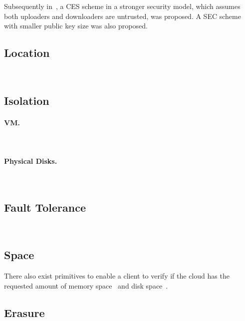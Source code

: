 Subsequently in~\cite{FB06}, a CES scheme in a stronger security model, which assumes both uploaders and downloaders are untrusted, was proposed. A SEC scheme with smaller public key size was also proposed.



\subsection{Location}

~\cite{BDS11,WSA+12}

\subsection{Isolation}

\paragraph{VM.}
~\cite{ZJO+11}

\paragraph{Physical Disks.}

~\cite{WSJ+12,WSJ+13,WSJ+14}

\subsection{Fault Tolerance}

~\cite{BDJ+11}

\subsection{Space}

There also exist primitives to enable a client to verify if the cloud has the requested amount of memory space~\cite{ABF13} and disk space~\cite{DFK+13}.

\subsection{Erasure}

~\cite{PT10}


